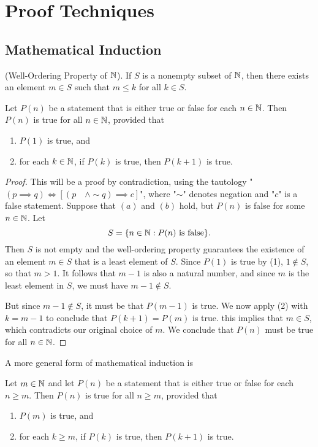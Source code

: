 \chapter{Proof Techniques}

\section{Mathematical Induction}

\begin{axiom}(Well-Ordering Property of $\mathbb{N}$).
	If $S$ is a nonempty subset of $\mathbb{N}$, then there exists an element $m\in S$ such that $m\leq k$ for all $k\in S$.
\end{axiom}

\begin{theorem}
	Let $P(n)$ be a statement that is either true or false for each $n\in \mathbb{N}$. Then $P(n)$ is true for all $n\in\mathbb{N}$, provided that
	\begin{enumerate}
		\item $P(1)$ is true, and
		\item for each $k\in \mathbb{N}$, if $P(k)$ is true, then $P(k+1)$ is true.
	\end{enumerate}
\end{theorem}

\begin{proof}
	This will be a proof by contradiction, using the tautology "$(p\implies q) \Leftrightarrow [(p \quad \land \sim q) \implies c]$", where "$\sim$" denotes negation and "$c$" is a false statement. Suppose that $(a)$ and $(b)$ hold, but $P(n)$ is false for some $n\in\mathbb{N}$. Let
	$$S=\{n\in\mathbb{N}:P(n)\text{ is false}\}.$$
	Then $S$ is not empty and the well-ordering property guarantees the existence of an element $m\in S$ that is a least element of $S$. Since $P(1)$ is true by (1), $1\notin S$, so that $m>1$. It follows that $m-1$ is also a natural number, and since $m$ is the least element in $S$, we must have $m-1\notin S$.
	
	But since $m-1\notin S$, it must be that $P(m-1)$ is true. We now apply (2) with $k=m-1$ to conclude that $P(k+1)=P(m)$ is true. this implies that $m\in S$, which contradicts our original choice of $m$. We conclude that $P(n)$ must be true for all $n\in\mathbb{N}$.
\end{proof}

A more general form of mathematical induction is

\begin{theorem}Let $m\in\mathbb{N}$ and let $P(n)$ be a statement that is either true or false for each $n\geq m$. Then $P(n)$ is true for all $n\geq m$, provided that
\begin{enumerate}
	\item $P(m)$ is true, and
	\item for each $k\geq m$, if $P(k)$ is true, then $P(k+1)$ is true.
\end{enumerate}
\end{theorem}

